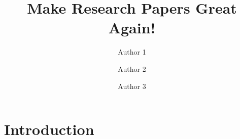 \documentclass[]{research}
\title{Make Research Papers Great Again!}
\author[*]{Author 1}
\author[*]{Author 2}
\author[]{Author 3}
\affiliation[]{}
\begin{document}
\maketitle

\section{Introduction}

\clearpage
\newpage




\end{document}
